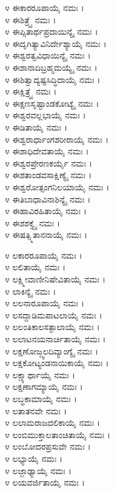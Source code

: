 
೪ ಈಕಾರರೂಪಾಯೈ ನಮಃ ।\\
೪ ಈಶಿತ್ರ್ಯೈ ನಮಃ ।\\
೪ ಈಪ್ಸಿತಾರ್ಥಪ್ರದಾಯಿನ್ಯೈ ನಮಃ ।\\
೪ ಈದೃಗಿತ್ಯಾವಿನಿರ್ದೇಶ್ಯಾಯೈ ನಮಃ ।\\
೪ ಈಶ್ವರತ್ವವಿಧಾಯಿನ್ಯೈ ನಮಃ ।\\
೪ ಈಶಾನಾದಿಬ್ರಹ್ಮಮಯ್ಯೈ ನಮಃ ।\\
೪ ಈಶಿತ್ವಾದ್ಯಷ್ಟಸಿದ್ಧಿದಾಯೈ ನಮಃ ।\\
೪ ಈಕ್ಷಿತ್ರ್ಯೈ ನಮಃ ।\\
೪ ಈಕ್ಷಣಸೃಷ್ಟಾಂಡಕೋಟ್ಯೈ ನಮಃ ।\\
೪ ಈಶ್ವರವಲ್ಲಭಾಯೈ ನಮಃ ।\\
೪ ಈಡಿತಾಯೈ ನಮಃ ।\\
೪ ಈಶ್ವರಾರ್ಧಾಂಗಶರೀರಾಯೈ ನಮಃ ।\\
೪ ಈಶಾಧಿದೇವತಾಯೈ ನಮಃ ।\\
೪ ಈಶ್ವರಪ್ರೇರಣಕರ್ಯೈ ನಮಃ ।\\
೪ ಈಶತಾಂಡವಸಾಕ್ಷಿಣ್ಯೈ ನಮಃ ।\\
೪ ಈಶ್ವರೋತ್ಸಂಗನಿಲಯಾಯೈ ನಮಃ ।\\
೪ ಈತಿಬಾಧಾವಿನಾಶಿನ್ಯೈ ನಮಃ ।\\
೪ ಈಹಾವಿರಹಿತಾಯೈ ನಮಃ ।\\
೪ ಈಶಶಕ್ತ್ಯೈ ನಮಃ ।\\
೪ ಈಷತ್ಸ್ಮಿತಾನನಾಯೈ ನಮಃ ।


೪ ಲಕಾರರೂಪಾಯೈ ನಮಃ ।\\
೪ ಲಲಿತಾಯೈ ನಮಃ ।\\
೪ ಲಕ್ಷ್ಮೀವಾಣೀನಿಷೇವಿತಾಯೈ ನಮಃ ।\\
೪ ಲಾಕಿನ್ಯೈ ನಮಃ ।\\
೪ ಲಲನಾರೂಪಾಯೈ ನಮಃ ।\\
೪ ಲಸದ್ದಾಡಿಮಪಾಟಲಾಯೈ ನಮಃ ।\\
೪ ಲಲಂತಿಕಾಲಸತ್ಫಾಲಾಯೈ ನಮಃ ।\\
೪ ಲಲಾಟನಯನಾರ್ಚಿತಾಯೈ ನಮಃ ।\\
೪ ಲಕ್ಷಣೋಜ್ಜ್ವಲದಿವ್ಯಾಂಗ್ಯೈ ನಮಃ ।\\
೪ ಲಕ್ಷಕೋಟ್ಯಂಡನಾಯಿಕಾಯೈ ನಮಃ ।\\
೪ ಲಕ್ಷ್ಯಾರ್ಥಾಯೈ ನಮಃ ।\\
೪ ಲಕ್ಷಣಾಗಮ್ಯಾಯೈ ನಮಃ ।\\
೪ ಲಬ್ಧಕಾಮಾಯೈ ನಮಃ ।\\
೪ ಲತಾತನವೇ ನಮಃ ।\\
೪ ಲಲಾಮರಾಜದಲಿಕಾಯೈ ನಮಃ ।\\
೪ ಲಂಬಿಮುಕ್ತಾಲತಾಂಚಿತಾಯೈ ನಮಃ ।\\
೪ ಲಂಬೋದರಪ್ರಸುವೇ ನಮಃ ।\\
೪ ಲಭ್ಯಾಯೈ ನಮಃ ।\\
೪ ಲಜ್ಜಾಢ್ಯಾಯೈ ನಮಃ ।\\
೪ ಲಯವರ್ಜಿತಾಯೈ ನಮಃ ।

